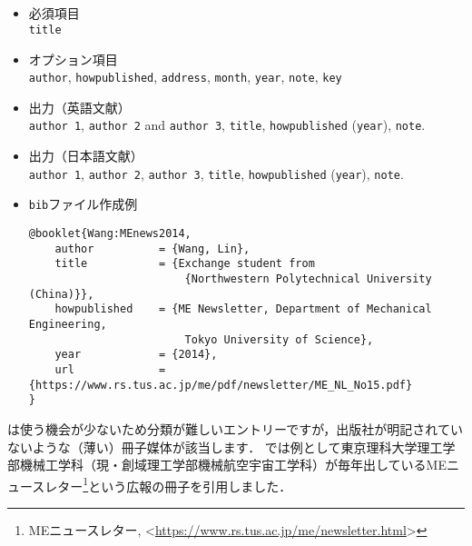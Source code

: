 \documentclass[a4paper,fleqn,uplatex,dvipdfmx]{jsarticle}
\begin{document}
\subsection{\ttbooklet}
\label{ssec:booklet}
\begin{screen}
    \begin{itemize}
        \item 必須項目 \\
        \verb|title|
        \item オプション項目 \\
        \verb|author|, \verb|howpublished|, \verb|address|, \verb|month|, \verb|year|, \verb|note|, \verb|key|
        \item 出力（英語文献） \\
            \colorbox[gray]{0.8}{\texttt{author 1}}, \colorbox[gray]{0.8}{\texttt{author 2}} and \colorbox[gray]{0.8}{\texttt{author 3}}, \colorbox[gray]{0.8}{\texttt{title}}, \colorbox[gray]{0.8}{\texttt{howpublished}} (\colorbox[gray]{0.8}{\texttt{year}}), \colorbox[gray]{0.8}{\texttt{note}}.
        \item 出力（日本語文献） \\
            \colorbox[gray]{0.8}{\texttt{author 1}}, \colorbox[gray]{0.8}{\texttt{author 2}}, \colorbox[gray]{0.8}{\texttt{author 3}}, \colorbox[gray]{0.8}{\texttt{title}}, \colorbox[gray]{0.8}{\texttt{howpublished}} (\colorbox[gray]{0.8}{\texttt{year}}), \colorbox[gray]{0.8}{\texttt{note}}.
        \item \verb|bib|ファイル作成例 \vspace{-3mm}
\begin{verbatim}
@booklet{Wang:MEnews2014,
    author          = {Wang, Lin},
    title           = {Exchange student from 
                        {Northwestern Polytechnical University (China)}},
    howpublished    = {ME Newsletter, Department of Mechanical Engineering, 
                        Tokyo University of Science},
    year            = {2014},
    url             = {https://www.rs.tus.ac.jp/me/pdf/newsletter/ME_NL_No15.pdf}
}
\end{verbatim}
    \end{itemize}
\end{screen}

\ttbooklet は使う機会が少ないため分類が難しいエントリーですが，出版社が明記されていないような（薄い）冊子媒体が該当します．
\JSMErepos では例として東京理科大学理工学部機械工学科（現・創域理工学部機械航空宇宙工学科）が毎年出しているMEニュースレター\footnote{MEニュースレター, \textless\url{https://www.rs.tus.ac.jp/me/newsletter.html}\textgreater}という広報の冊子を引用しました．
\end{document}
